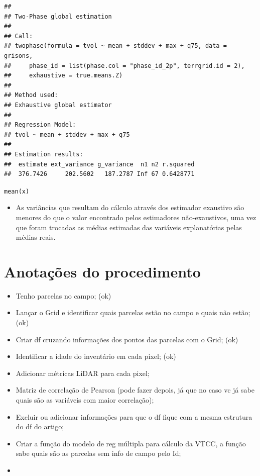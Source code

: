 \documentclass[
]{article}
\providecommand{\tightlist}{%
  \setlength{\itemsep}{0pt}\setlength{\parskip}{0pt}}
\begin{document}
\begin{verbatim}
## 
## Two-Phase global estimation
##  
## Call: 
## twophase(formula = tvol ~ mean + stddev + max + q75, data = grisons, 
##     phase_id = list(phase.col = "phase_id_2p", terrgrid.id = 2), 
##     exhaustive = true.means.Z)
## 
## Method used:
## Exhaustive global estimator
##  
## Regression Model:
## tvol ~ mean + stddev + max + q75
## 
## Estimation results:
##  estimate ext_variance g_variance  n1 n2 r.squared
##  376.7426     202.5602   187.2787 Inf 67 0.6428771
\end{verbatim}

\texttt{mean(x)}

\begin{itemize}
\tightlist
\item
  As variâncias que resultam do cálculo através dos estimador exaustivo
  são menores do que o valor encontrado pelos estimadores
  não-exaustivos, uma vez que foram trocadas as médias estimadas das
  variáveis explanatórias pelas médias reais.
\end{itemize}

\section{Anotações do
procedimento}\label{anotauxe7uxf5es-do-procedimento}

\begin{itemize}
\tightlist
\item
  Tenho parcelas no campo; (ok)\\
\item
  Lançar o Grid e identificar quais parcelas estão no campo e quais não
  estão; (ok)
\item
  Criar df cruzando informações dos pontos das parcelas com o Grid; (ok)
\item
  Identificar a idade do inventário em cada pixel; (ok)
\item
  Adicionar métricas LiDAR para cada pixel;
\item
  Matriz de correlação de Pearson (pode fazer depois, já que no caso vc
  já sabe quais são as variáveis com maior correlação);
\item
  Excluir ou adicionar informações para que o df fique com a mesma
  estrutura do df do artigo;
\item
  Criar a função do modelo de reg múltipla para cálculo da VTCC, a
  função sabe quais são as parcelas sem info de campo pelo Id;
\item
\end{itemize}
\end{document}
